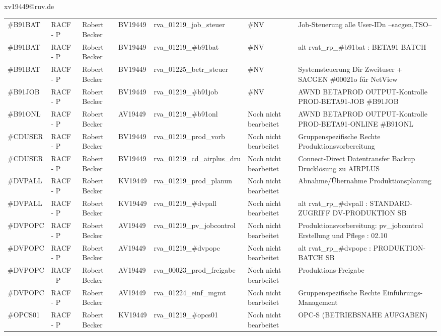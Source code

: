 \documentclass[a4paper,landscape,12pt]{letter}
\begin{document}
\begin{letter}{xv19449@ruv.de\hfill \break}
\begin{tiny}
\begin{longtable}{|p{35mm}|p{15mm}|p{25mm}|p{10mm}|p{40mm}|p{50mm}|p{50mm}|}
\#B91BAT & RACF - P & Robert Becker & BV19449 & rva\_01219\_job\_steuer & \#NV & Job-Steuerung alle User-IDn --sacgen,TSO-- \\
\#B91BAT & RACF - P & Robert Becker & BV19449 & rva\_01219\_\#b91bat & \#NV & alt rvat\_rp\_\#b91bat          : BETA91 BATCH \\
\#B91BAT & RACF - P & Robert Becker & BV19449 & rva\_01225\_betr\_steuer & \#NV & Systemsteuerung Dir Zweituser + SACGEN \#00021o für NetView \\
\#B91JOB & RACF - P & Robert Becker & BV19449 & rva\_01219\_\#b91job & \#NV & AWND BETAPROD OUTPUT-Kontrolle PROD-BETA91-JOB \#B91JOB \\
\#B91ONL & RACF - P & Robert Becker & AV19449 & rva\_01219\_\#b91onl & Noch nicht bearbeitet & AWND BETAPROD OUTPUT-Kontrolle PROD-BETA91-ONLINE \#B91ONL \\
\#CDUSER & RACF - P & Robert Becker & BV19449 & rva\_01219\_prod\_vorb & Noch nicht bearbeitet & Gruppenspezifische Rechte Produktionsvorbereitung \\
\#CDUSER & RACF - P & Robert Becker & BV19449 & rva\_01219\_cd\_airplus\_dru & Noch nicht bearbeitet & Connect-Direct Datentransfer Backup Drucklösung zu AIRPLUS \\
\#DVPALL & RACF - P & Robert Becker & KV19449 & rva\_01219\_prod\_planun & Noch nicht bearbeitet & Abnahme/Übernahme Produktionsplanung \\
\#DVPALL & RACF - P & Robert Becker & KV19449 & rva\_01219\_\#dvpall & Noch nicht bearbeitet & alt rvat\_rp\_\#dvpall          : STANDARD-ZUGRIFF DV-PRODUKTION SB \\
\#DVPOPC & RACF - P & Robert Becker & AV19449 & rva\_01219\_pv\_jobcontrol & Noch nicht bearbeitet & Produktionsvorbereitung: pv\_jobcontrol Erstellung und Pflege : 02.10 \\
\#DVPOPC & RACF - P & Robert Becker & AV19449 & rva\_01219\_\#dvpopc & Noch nicht bearbeitet & alt rvat\_rp\_\#dvpopc          : PRODUKTION-BATCH SB \\
\#DVPOPC & RACF - P & Robert Becker & AV19449 & rva\_00023\_prod\_freigabe & Noch nicht bearbeitet & Produktions-Freigabe \\
\#DVPOPC & RACF - P & Robert Becker & AV19449 & rva\_01224\_einf\_mgmt & Noch nicht bearbeitet & Gruppenspezifische Rechte Einführungs-Management \\
\#OPCS01 & RACF - P & Robert Becker & KV19449 & rva\_01219\_\#opcs01 & Noch nicht bearbeitet & OPC-S (BETRIEBSNAHE AUFGABEN) \\

\end{longtable}
\end{tiny}
\end{letter}
\end{document}
